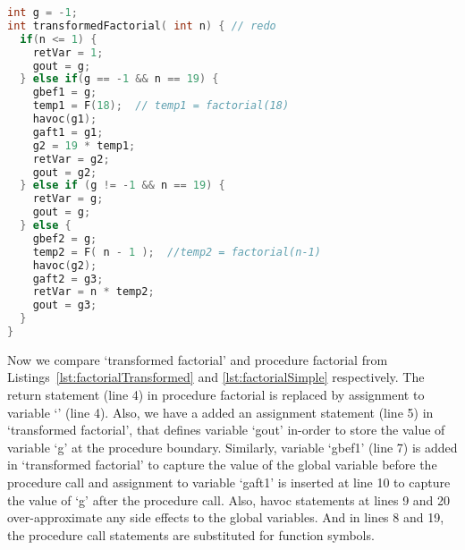 \begin{lstlisting}[language=c, caption= {Procedure factorial from
      Listing~\ref{lst:factorialSimple} converted to the form our
      approach expects. We refer to this procedure as `transformed
      factorial'.}, label=lst:factorialTransformed]
int g = -1;
int transformedFactorial( int n) { // redo
  if(n <= 1) {
    retVar = 1;
    gout = g;
  } else if(g == -1 && n == 19) {
    gbef1 = g;
    temp1 = F(18);  // temp1 = factorial(18)
    havoc(g1);
    gaft1 = g1;
    g2 = 19 * temp1;
    retVar = g2;
    gout = g2;
  } else if (g != -1 && n == 19) {
    retVar = g;
    gout = g;
  } else {
    gbef2 = g;
    temp2 = F( n - 1 );  //temp2 = factorial(n-1)
    havoc(g2);
    gaft2 = g3;
    retVar = n * temp2;
    gout = g3;
  }
}
\end{lstlisting}


Now we compare `transformed factorial' and procedure factorial from
Listings~\ref{lst:factorialTransformed} and \ref{lst:factorialSimple}
respectively. The return statement (line 4) in procedure factorial
is replaced by assignment to variable `\retVar' (line 4). Also, we
have a added an assignment statement (line 5) in `transformed
factorial', that defines variable `gout' in-order to store the value
of variable `g' at the procedure boundary. Similarly, variable `gbef1'
(line 7) is added in `transformed factorial' to capture the value of
the global variable before the procedure call and assignment to
variable `gaft1' is inserted at line 10 to capture the value of `g'
after the procedure call. Also, havoc statements at lines 9 and 20
over-approximate any side effects to the global variables. And in
lines 8 and 19, the procedure call statements are substituted for
function symbols.

